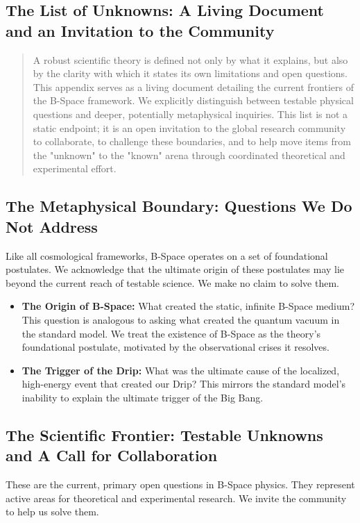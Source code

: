 \documentclass{BSpacePaper} %
\begin{document}
\begin{appendices}
\clearpage

\section{The List of Unknowns: A Living Document and an Invitation to the Community}
\label{app:unknowns}

\begin{abstract}
\noindent
A robust scientific theory is defined not only by what it explains, but also by the clarity with which it states its own limitations and open questions. This appendix serves as a living document detailing the current frontiers of the B-Space framework. We explicitly distinguish between testable physical questions and deeper, potentially metaphysical inquiries. This list is not a static endpoint; it is an open invitation to the global research community to collaborate, to challenge these boundaries, and to help move items from the "unknown" to the "known" arena through coordinated theoretical and experimental effort.
\end{abstract}

\subsection{The Metaphysical Boundary: Questions We Do Not Address}
Like all cosmological frameworks, B-Space operates on a set of foundational postulates. We acknowledge that the ultimate origin of these postulates may lie beyond the current reach of testable science. We make no claim to solve them.
\begin{itemize}
    \item \textbf{The Origin of B-Space:} What created the static, infinite B-Space medium? This question is analogous to asking what created the quantum vacuum in the standard model. We treat the existence of B-Space as the theory's foundational postulate, motivated by the observational crises it resolves.
    \item \textbf{The Trigger of the Drip:} What was the ultimate cause of the localized, high-energy event that created our Drip? This mirrors the standard model's inability to explain the ultimate trigger of the Big Bang.
\end{itemize}

\subsection{The Scientific Frontier: Testable Unknowns and A Call for Collaboration}
These are the current, primary open questions in B-Space physics. They represent active areas for theoretical and experimental research. We invite the community to help us solve them.


\end{appendices}
\end{document}
